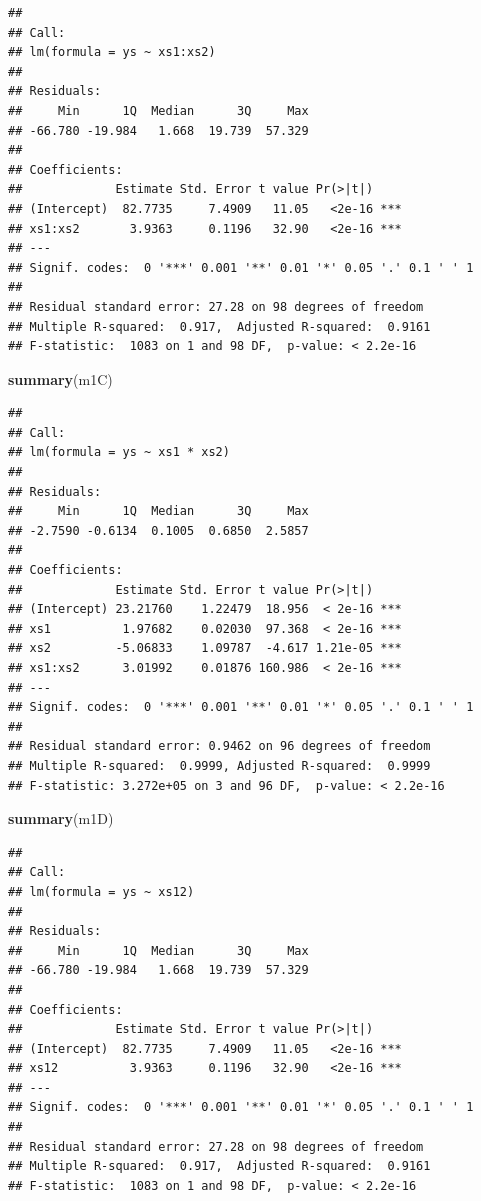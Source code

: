 \documentclass[
]{book}
\newenvironment{Shaded}{\begin{snugshade}}{\end{snugshade}}
\newcommand{\KeywordTok}[1]{\textcolor[rgb]{0.13,0.29,0.53}{\textbf{#1}}}
\newcommand{\NormalTok}[1]{#1}
\begin{document}
\begin{verbatim}
## 
## Call:
## lm(formula = ys ~ xs1:xs2)
## 
## Residuals:
##     Min      1Q  Median      3Q     Max 
## -66.780 -19.984   1.668  19.739  57.329 
## 
## Coefficients:
##             Estimate Std. Error t value Pr(>|t|)    
## (Intercept)  82.7735     7.4909   11.05   <2e-16 ***
## xs1:xs2       3.9363     0.1196   32.90   <2e-16 ***
## ---
## Signif. codes:  0 '***' 0.001 '**' 0.01 '*' 0.05 '.' 0.1 ' ' 1
## 
## Residual standard error: 27.28 on 98 degrees of freedom
## Multiple R-squared:  0.917,	Adjusted R-squared:  0.9161 
## F-statistic:  1083 on 1 and 98 DF,  p-value: < 2.2e-16
\end{verbatim}

\begin{Shaded}
\begin{Highlighting}[]
\KeywordTok{summary}\NormalTok{(m1C)}
\end{Highlighting}
\end{Shaded}

\begin{verbatim}
## 
## Call:
## lm(formula = ys ~ xs1 * xs2)
## 
## Residuals:
##     Min      1Q  Median      3Q     Max 
## -2.7590 -0.6134  0.1005  0.6850  2.5857 
## 
## Coefficients:
##             Estimate Std. Error t value Pr(>|t|)    
## (Intercept) 23.21760    1.22479  18.956  < 2e-16 ***
## xs1          1.97682    0.02030  97.368  < 2e-16 ***
## xs2         -5.06833    1.09787  -4.617 1.21e-05 ***
## xs1:xs2      3.01992    0.01876 160.986  < 2e-16 ***
## ---
## Signif. codes:  0 '***' 0.001 '**' 0.01 '*' 0.05 '.' 0.1 ' ' 1
## 
## Residual standard error: 0.9462 on 96 degrees of freedom
## Multiple R-squared:  0.9999,	Adjusted R-squared:  0.9999 
## F-statistic: 3.272e+05 on 3 and 96 DF,  p-value: < 2.2e-16
\end{verbatim}

\begin{Shaded}
\begin{Highlighting}[]
\KeywordTok{summary}\NormalTok{(m1D)}
\end{Highlighting}
\end{Shaded}

\begin{verbatim}
## 
## Call:
## lm(formula = ys ~ xs12)
## 
## Residuals:
##     Min      1Q  Median      3Q     Max 
## -66.780 -19.984   1.668  19.739  57.329 
## 
## Coefficients:
##             Estimate Std. Error t value Pr(>|t|)    
## (Intercept)  82.7735     7.4909   11.05   <2e-16 ***
## xs12          3.9363     0.1196   32.90   <2e-16 ***
## ---
## Signif. codes:  0 '***' 0.001 '**' 0.01 '*' 0.05 '.' 0.1 ' ' 1
## 
## Residual standard error: 27.28 on 98 degrees of freedom
## Multiple R-squared:  0.917,	Adjusted R-squared:  0.9161 
## F-statistic:  1083 on 1 and 98 DF,  p-value: < 2.2e-16
\end{verbatim}
\end{document}
